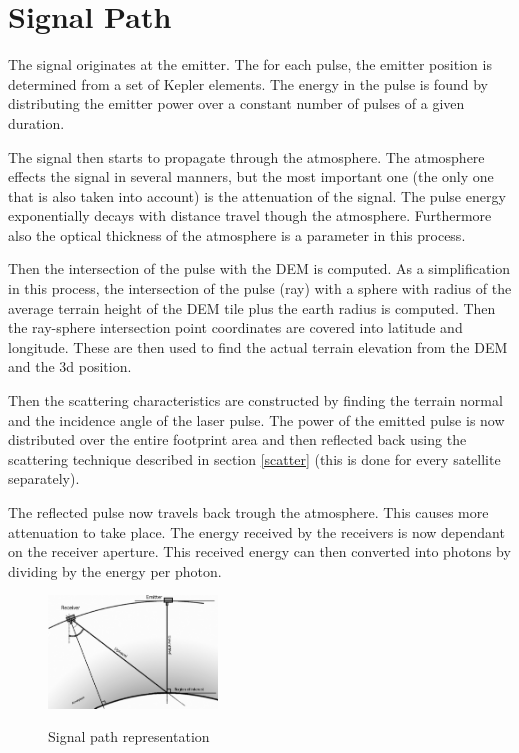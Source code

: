 \section{Signal Path}
\label{signPath}

The signal originates at the emitter. The for each pulse, the emitter position is determined from a
set of Kepler elements. The energy in the pulse is found by distributing the emitter power over a
constant number of pulses of a given duration.

The signal then starts to propagate through the atmosphere. The atmosphere effects the signal in
several manners, but the most important one (the only one that is also taken into account) is the
attenuation of the signal. The pulse energy exponentially decays with distance travel though the
atmosphere. Furthermore also the optical thickness of the atmosphere is a parameter in this process.

Then the intersection of the pulse with the \ac{DEM} is computed. As a simplification in this
process, the intersection of the pulse (ray) with a sphere with radius of the average terrain height
of the \ac{DEM} tile plus the earth radius is computed. Then the ray-sphere intersection point
coordinates are covered into latitude and longitude. These are then used to find the actual terrain
elevation from the \ac{DEM} and the 3d position.

Then the scattering characteristics are constructed by finding the terrain normal and the incidence
angle of the laser pulse. The power of the emitted pulse is now distributed over the entire
footprint area and then reflected back using the scattering technique described in section
\ref{scatter} (this is done for every satellite separately).

The reflected pulse now travels back trough the atmosphere. This causes more attenuation to take
place. The energy received by the receivers is now dependant on the receiver aperture. This received
energy can then converted into photons by dividing by the energy per photon.

\begin{figure}[ht!]
	\centering
		\includegraphics[width=0.4\textwidth]{chapters/img/signalPath.png}
		\label{fig:scatter}
	\caption{Signal path representation}
\end{figure}










